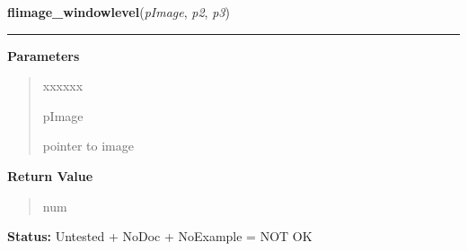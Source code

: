 \hspace{.8\funcindent}\begin{boxedminipage}{\funcwidth}

    \raggedright \textbf{flimage\_windowlevel}(\textit{pImage}, \textit{p2}, \textit{p3})

    \vspace{-1.5ex}

    \rule{\textwidth}{0.5\fboxrule}
\setlength{\parskip}{2ex}
\setlength{\parskip}{1ex}
      \textbf{Parameters}
      \vspace{-1ex}

      \begin{quote}
        \begin{Ventry}{xxxxxx}

          \item[pImage]

          pointer to image

        \end{Ventry}

      \end{quote}

      \textbf{Return Value}
    \vspace{-1ex}

      \begin{quote}
      num

      \end{quote}

\textbf{Status:} Untested + NoDoc + NoExample = NOT OK



    \end{boxedminipage}

    \label{xformslib:library:flimage_enhance}

    \vspace{0.5ex}

